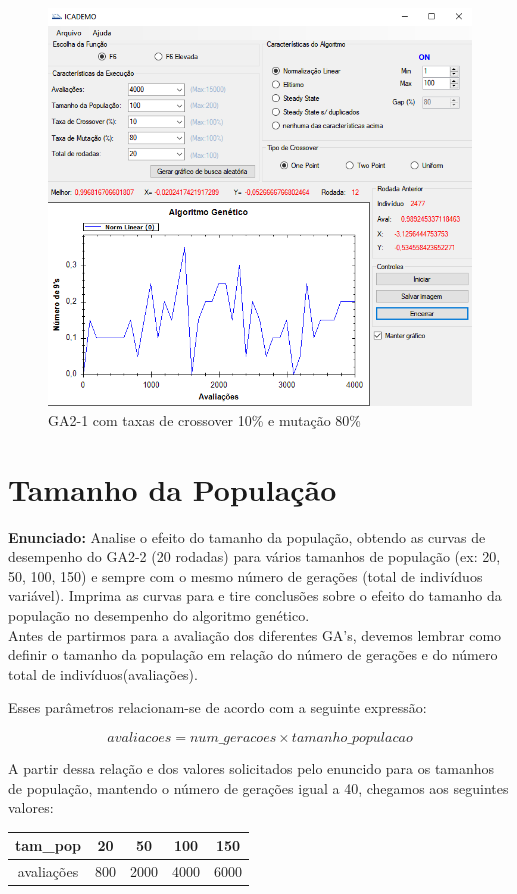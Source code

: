 \documentclass[12pt]{article}
\begin{document}
\begin{figure}[H]
	\centering
	\includegraphics[width=0.7\linewidth]{Imagens/questao3}
	\caption{GA2-1 com taxas de crossover 10\% e mutação 80\%}
	\label{fig:questao3}
\end{figure}


\section{Tamanho da População}
\textbf{Enunciado:}
Analise o efeito do tamanho da população, obtendo as curvas de desempenho do GA2-2 (20 rodadas) para vários tamanhos de população (ex: 20, 50, 100, 150) e sempre com o mesmo número de gerações (total de indivíduos variável). Imprima as curvas para e tire conclusões sobre o efeito do tamanho da população no desempenho do
algoritmo genético.\\

Antes de partirmos para a avaliação dos diferentes GA's, devemos lembrar como definir o tamanho da população em relação do número de gerações e do número total de indivíduos(avaliações).

Esses parâmetros relacionam-se de acordo com a seguinte expressão:

\begin{equation*}
	avaliacoes=num\_geracoes\times tamanho\_populacao
\end{equation*}

A partir dessa relação e dos valores solicitados pelo enuncido para os tamanhos de população, mantendo o número de gerações igual a 40, chegamos aos seguintes valores:

\begin{table}[H]
	\centering
	\begin{tabular}{|c|c|c|c|c|}
		\hline
		tam\_pop & 20 & 50 & 100 & 150 \\
		\hline
		avaliações & 800 & 2000 & 4000 & 6000 \\
		\hline
	\end{tabular}
\end{table}
\end{document}
